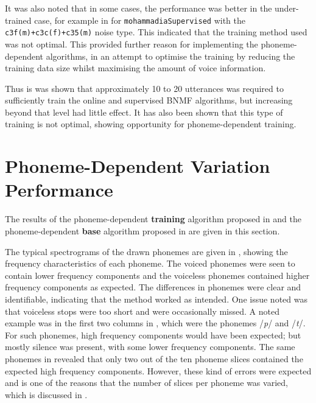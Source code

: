 It was also noted that in some cases, the performance was better in
the under-trained case, for example in  for
\lstinline!mohammadiaSupervised! with the\linebreak{}
\lstinline!c3f(m)+c3c(f)+c35(m)! noise type.
This indicated that the training method used was not optimal. This
provided further reason for implementing the phoneme-dependent algorithms,
in an attempt to optimise the training by reducing the training data
size whilst maximising the amount of voice information.

Thus is was shown that approximately 10 to 20 utterances was required
to sufficiently train the online and supervised \ac{BNMF} algorithms,
but increasing beyond that level had little effect. It has also been
shown that this type of training is not optimal, showing opportunity
for phoneme-dependent training.

\clearpage{}


\section{Phoneme-Dependent Variation Performance}

The results of the phoneme-dependent \textbf{training} algorithm proposed
in  and the phoneme-dependent \textbf{base}
algorithm proposed in  are given in this
section.

The typical spectrograms of the drawn phonemes are given in ,
showing the frequency characteristics of each phoneme. The voiced
phonemes were seen to contain lower frequency components and the voiceless
phonemes contained higher frequency components as expected. The differences
in phonemes were clear and identifiable, indicating that the method
worked as intended. One issue noted was that voiceless stops were
too short and were occasionally missed. A noted example was in the
first two columns in , which were the
phonemes /\textit{p}/ and /\textit{t}/. For such phonemes, high frequency
components would have been expected; but mostly silence was present,
with some lower frequency components. The same phonemes in 
revealed that only two out of the ten phoneme slices contained the
expected high frequency components. However, these kind of errors
were expected and is one of the reasons that the number of slices
per phoneme was varied, which is discussed in .

